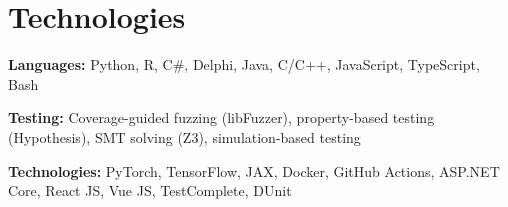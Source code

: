 \section{Technologies}

    \begin{onecolentry}
        \textbf{Languages:} Python, R, C\#, Delphi, Java, C/C++, JavaScript, TypeScript, Bash
    \end{onecolentry}

    \entrygap

    \begin{onecolentry}
        \textbf{Testing:} Coverage-guided fuzzing (libFuzzer), property-based testing (Hypothesis), SMT solving (Z3), simulation-based testing
    \end{onecolentry}

    \entrygap

    \begin{onecolentry}
        \textbf{Technologies:} PyTorch, TensorFlow, JAX, Docker, GitHub Actions, ASP.NET Core, React JS, Vue JS, TestComplete, DUnit \end{onecolentry}
